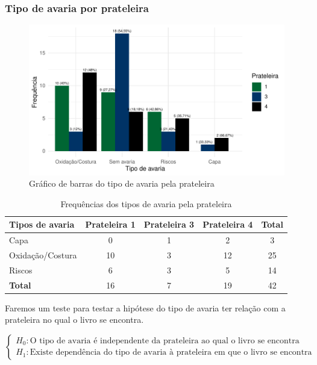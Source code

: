 \documentclass[a4paper, 12pt]{article}
\begin{document}
\newpage

\subsubsection{Tipo de avaria por prateleira}

\begin{figure}[H]
    \centering
    \caption{Gráfico de barras do tipo de avaria pela prateleira}
    \includegraphics[scale=1]{grafico1.pdf}
\end{figure}

\begin{table}[H]
\centering
\caption{Frequências dos tipos de avaria pela prateleira}
\begin{tabular}{l|ccc|c}
\hline
\textbf{Tipos de avaria} & \textbf{Prateleira 1} & \textbf{Prateleira 3} & \textbf{Prateleira 4} & \textbf{Total} \\ \hline
Capa                 & 0 & 1 & 2 & 3 \\
Oxidação/Costura & 10 & 3 & 12 & 25 \\
Riscos                & 6 & 3 & 5 & 14 \\ \hline
\textbf{Total}      & 16 & 7 & 19 & 42 \\ \hline
\end{tabular}
\end{table}

Faremos um teste para testar a hipótese do tipo de avaria ter relação com a prateleira no qual o livro se encontra.

$$\begin{cases}
H_0 : \mbox{O tipo de avaria é independente da prateleira ao qual o livro se encontra}\\
H_1 : \mbox{Existe dependência do tipo de avaria à prateleira em que o livro se encontra}
\end{cases}$$\\
\end{document}
